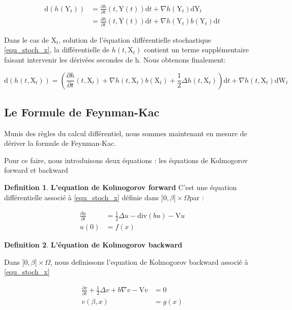 \documentclass[11pt]{article}
\theoremstyle{definition}
\newtheorem{definition}{Definition}[section]
\theoremstyle{remark}
\begin{document}
\begin{align*}
\mathrm{d}(h(\mathrm{Y}_{t})) &= \frac{\partial h}{\partial t}(t,\mathrm{Y}(t)) \mathrm{d}t + \nabla h(\mathrm{Y}_{t}) \mathrm{dY}_{t} \\
&= \frac{\partial h}{\partial t}(t,\mathrm{Y}(t)) \mathrm{d}t + \nabla h(\mathrm{Y}_{t}) b(\mathrm{Y}_{t})\mathrm{d}t
\end{align*}

Dans le cas de $\mathrm{X}_{t}$, solution de l'équation différentielle stochastique \eqref{equ_stoch_x}, la différentielle de $h(t, \mathrm{X}_t)$ contient un terme supplémentaire faisant intervenir les dérivées secondes de h. Nous obtenons finalement:

\begin{equation}
\mathrm{d}(h(t,\mathrm{X}_t)) = ( \frac{\partial h}{\partial t}(t, \mathrm{X}_t) + \nabla h(t,\mathrm{X}_t) b(\mathrm{X}_t) + \frac{1}{2} \Delta h(t,\mathrm{X}_t) )\mathrm{d}t + \nabla h(t,\mathrm{X}_t) \mathrm{dW}_{t}
\end{equation}

\subsection{Le Formule de Feynman-Kac}

Munis des règles du calcul différentiel, nous sommes maintenant en mesure de dériver la formule de Feynman-Kac.

Pour ce faire, nous introduisons deux équations : les équations de Kolmogorov forward et backward 

\begin{definition}{\textbf{L'equation de Kolmogorov forward}}
C'est une équation différentielle associé à \eqref{equ_stoch_x} définie  dans $]0,\beta] \times \Omega$par : 

\begin{equation}
\label{kolmo_forw}
\begin{split}
\frac{\partial u}{\partial t} &= \frac{1}{2} \Delta u - \mathrm{div}(bu) - \mathrm{V}u \\
u(0) &= f(x)
\end{split}
\end{equation}

\end{definition}



\begin{definition}{\textbf{L'équation de Kolmogorov backward}}

Dans $]0,\beta] \times \Omega$, nous definissons l'equation de Kolmogorov backward associé à \eqref{equ_stoch_x}

\begin{equation}
\label{kolmo_back}
\begin{split}
\frac{\partial v}{\partial t} + \frac{1}{2} \Delta v + b \nabla v - \mathrm{V}v &= 0 \\
v(\beta, x) &= g(x)
\end{split}
\end{equation}
\end{definition}
\end{document}
